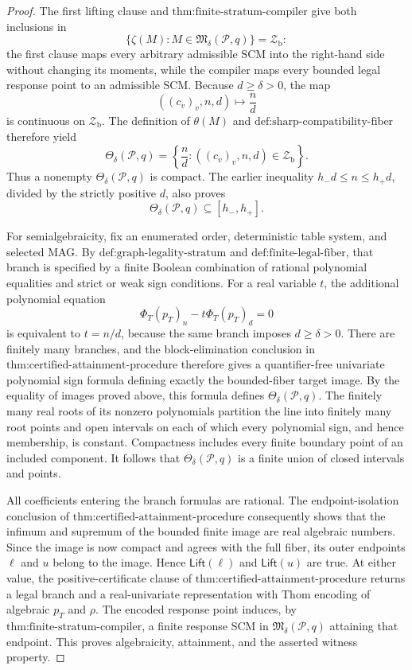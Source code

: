 \documentclass{article}
\begin{document}
\begin{proof}
The first lifting clause and \(\text{thm:finite-stratum-compiler}\) give both inclusions in
\[
 \{\zeta(M):M\in\mathfrak M_\delta(\mathcal P,q)\}
 =\mathcal Z_{\mathrm b}:
\]
the first clause maps every arbitrary admissible SCM into the right-hand side without changing its moments, while the compiler maps every bounded legal response point to an admissible SCM.  Because \(d\ge\delta>0\), the map
\[
 ((c_v)_v,n,d)\longmapsto \frac nd
\]
is continuous on \(\mathcal Z_{\mathrm b}\).  The definition of \(\theta(M)\) and \(\text{def:sharp-compatibility-fiber}\) therefore yield
\[
 \Theta_\delta(\mathcal P,q)
 =\left\{\frac nd:((c_v)_v,n,d)\in\mathcal Z_{\mathrm b}\right\}.
\]
Thus a nonempty \(\Theta_\delta(\mathcal P,q)\) is compact.  The earlier inequality \(h_-d\le n\le h_+d\), divided by the strictly positive \(d\), also proves
\[
 \Theta_\delta(\mathcal P,q)\subseteq[h_-,h_+].
\]

For semialgebraicity, fix an enumerated order, deterministic table system, and selected MAG.  By \(\text{def:graph-legality-stratum}\) and \(\text{def:finite-legal-fiber}\), that branch is specified by a finite Boolean combination of rational polynomial equalities and strict or weak sign conditions.  For a real variable \(t\), the additional polynomial equation
\[
 \Phi_T(p_T)_n-t\Phi_T(p_T)_d=0
\]
is equivalent to \(t=n/d\), because the same branch imposes \(d\ge\delta>0\).  There are finitely many branches, and the block-elimination conclusion in \(\text{thm:certified-attainment-procedure}\) therefore gives a quantifier-free univariate polynomial sign formula defining exactly the bounded-fiber target image.  By the equality of images proved above, this formula defines \(\Theta_\delta(\mathcal P,q)\).  The finitely many real roots of its nonzero polynomials partition the line into finitely many root points and open intervals on each of which every polynomial sign, and hence membership, is constant.  Compactness includes every finite boundary point of an included component.  It follows that \(\Theta_\delta(\mathcal P,q)\) is a finite union of closed intervals and points.

All coefficients entering the branch formulas are rational.  The endpoint-isolation conclusion of \(\text{thm:certified-attainment-procedure}\) consequently shows that the infimum and supremum of the bounded finite image are real algebraic numbers.  Since the image is now compact and agrees with the full fiber, its outer endpoints \(\ell\) and \(u\) belong to the image.  Hence \(\mathsf{Lift}(\ell)\) and \(\mathsf{Lift}(u)\) are true.  At either value, the positive-certificate clause of \(\text{thm:certified-attainment-procedure}\) returns a legal branch and a real-univariate representation with Thom encoding of algebraic \(p_T\) and \(\rho\).  The encoded response point induces, by \(\text{thm:finite-stratum-compiler}\), a finite response SCM in \(\mathfrak M_\delta(\mathcal P,q)\) attaining that endpoint.  This proves algebraicity, attainment, and the asserted witness property.


\end{proof}
\end{document}
